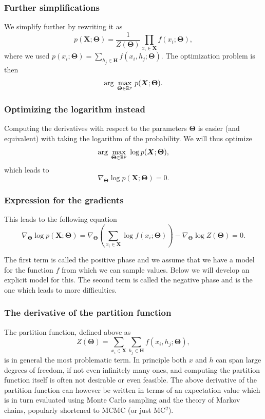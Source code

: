 \documentclass{beamer}
\begin{document}
\begin{frame}
\frametitle{Further simplifications}

We simplify further by rewriting it as
\[
p(\bm{X};\bm{\Theta})=\frac{1}{Z(\bm{\Theta})}\prod_{x_i\in \bm{X}}f(x_i;\bm{\Theta}),
\]
where we used $p(x_i;\bm{\Theta}) = \sum_{h_j\in \bm{H}}f(x_i,h_j;\bm{\Theta})$.
The optimization problem is then
\[
{\displaystyle \mathrm{arg} \hspace{0.1cm}\max_{\bm{\bm{\Theta}}\in {\mathbb{R}}^{p}}} \hspace{0.1cm}p(\bm{X};\bm{\Theta}).
\]
\end{frame}

\begin{frame}
\frametitle{Optimizing the logarithm instead}

Computing the derivatives with respect to the parameters $\bm{\Theta}$ is
easier (and equivalent) with taking the logarithm of the
probability. We will thus optimize
\[
{\displaystyle \mathrm{arg} \hspace{0.1cm}\max_{\bm{\bm{\Theta}}\in {\mathbb{R}}^{p}}} \hspace{0.1cm}\log{p(\bm{X};\bm{\Theta})},
\]
which leads to
\[
\nabla_{\bm{\Theta}}\log{p(\bm{X};\bm{\Theta})}=0.
\]
\end{frame}

\begin{frame}
\frametitle{Expression for the gradients}

This leads to the following equation
\[
\nabla_{\bm{\Theta}}\log{p(\bm{X};\bm{\Theta})}=\nabla_{\bm{\Theta}}\left(\sum_{x_i\in \bm{X}}\log{f(x_i;\bm{\Theta})}\right)-\nabla_{\bm{\Theta}}\log{Z(\bm{\Theta})}=0.
\]

The first term is called the positive phase and we assume that we have a model for the function $f$ from which we can sample values. Below we will develop an explicit model for this.
The second term is called the negative phase and is the one which leads to more difficulties.
\end{frame}

\begin{frame}
\frametitle{The derivative of the partition function}

The partition function, defined above as
\[
Z(\bm{\Theta})=\sum_{x_i\in \bm{X}}\sum_{h_j\in \bm{H}} f(x_i,h_j;\bm{\Theta}),
\]
is in general the most problematic term. In principle both $x$ and $h$ can span large degrees of freedom, if not even infinitely many ones, and computing the partition function itself is often not desirable or even feasible. The above derivative of the partition function can however be written in terms of an expectation value which is in turn evaluated  using Monte Carlo sampling and the theory of Markov chains, popularly shortened to MCMC (or just MC$^2$).
\end{frame}
\end{document}
